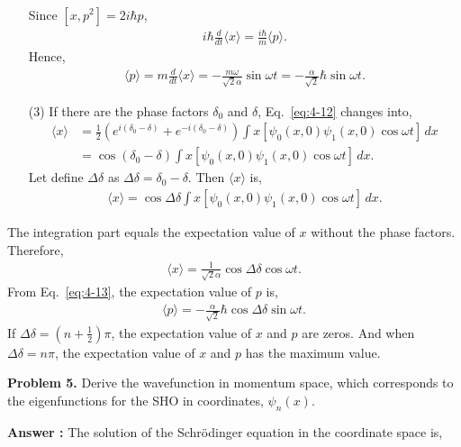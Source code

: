 \documentclass[floatfix,nofootinbib,superscriptaddress,fleqn]{revtex4-2}
\begin{document}
\begin{itemize}
\begin{align*}
  \end{align*}
  Since $\left[x,p^2\right]=2i\hbar p$,
  \begin{align*}
    i\hbar\frac{d}{dt}\langle x \rangle
    =\frac{i\hbar}{m}\langle
     p\rangle.
  \end{align*}
  Hence,
  \begin{align}\label{eq:4-13}
    \langle p\rangle
    =m\frac{d}{dt}\langle x \rangle
    =-\frac{m\omega}{\sqrt{2}\alpha}\sin{\omega t}
    =-\frac{\alpha}{\sqrt{2}}\hbar\sin{\omega t}.
  \end{align}
  \item[(3)] 
  If there are the phase factors $\delta_0$ and $\delta$,
  Eq.~\eqref{eq:4-12} changes into,
  \begin{align*}
      \langle x \rangle&=\frac{1}{2}
      \left(e^{i(\delta_0-\delta)}+e^{-i(\delta_0-\delta)}\right)
      \int x\left[\psi_0(x,0)\psi_1(x,0)\cos{\omega t}\right]\,dx  \\
      &=\cos{(\delta_0-\delta)}
      \int x\left[\psi_0(x,0)\psi_1(x,0)\cos{\omega t}\right]\,dx.
  \end{align*}
  Let define $\Delta\delta$ as $\Delta\delta=\delta_0-\delta$. Then 
  $\langle x \rangle$ is,
  \begin{align*}
    \langle x \rangle=\cos{\Delta\delta}
    \int x\left[\psi_0(x,0)\psi_1(x,0)\cos{\omega t}\right]\,dx.
  \end{align*}
\end{itemize}
The integration part equals the expectation value of $x$ 
without the phase factors. Therefore,
\begin{align*}
  \langle x \rangle=
  \frac{1}{\sqrt{2}\alpha}\cos{\Delta\delta}\cos{\omega t}.
\end{align*}
From Eq.~\eqref{eq:4-13}, the expectation value of $p$ is,
\begin{align*}
  \langle p \rangle=
  -\frac{\alpha}{\sqrt{2}}\hbar\cos{\Delta\delta}\sin{\omega t}.
\end{align*}
If $\Delta\delta=\left(n+\frac{1}{2}\right)\pi$, the expectation value of 
$x$ and $p$ are zeros. And when $\Delta\delta=n\pi$,  the expectation value of 
$x$ and $p$ has the maximum value.
 \vspace{1cm}

\noindent \textbf{Problem 5.}
Derive the wavefunction in momentum space, which corresponds to the
eigenfunctions for the SHO in coordinates, $\psi_n(x)$. 

\noindent \textbf{Answer : }
The solution of the Schr\"odinger equation in the 
coordinate space is,
\end{document}
